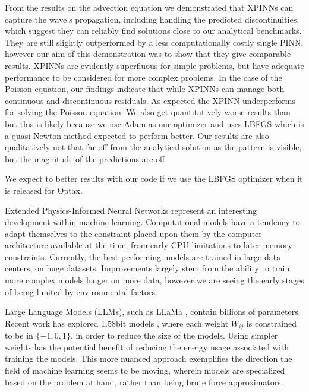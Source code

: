 From the results on the advection equation we demonstrated that XPINNs can capture the wave's propagation, including handling the predicted discontinuities, which suggest they can reliably find solutions close to our  analytical benchmarks. They are still slightly outperformed by a less computationally costly single PINN, however our aim of this demonstration was to show that they give comparable results. XPINNs are evidently superfluous for simple problems, but have adequate performance to be considered for more complex problems.
In the case of the Poisson equation, our findings indicate that while XPINNs can manage both continuous and discontinuous residuals. As expected the XPINN underperforms for solving the Poisson equation. We also get quantitatively worse results than \cite{XPINN_generalize} but this is likely because we use Adam as our optimizer and \cite{XPINN_generalize} uses LBFGS which is a quasi-Newton method expected to perform better. Our results are also qualitatively not that far off from the analytical solution as the pattern is visible, but the magnitude of the predictions are off.

We expect to better results with our code if we use the LBFGS optimizer when it is released for Optax.



Extended Physics-Informed Neural Networks represent an interesting development within machine learning.
Computational models have a tendency to adapt themselves to the constraint placed upon them by the computer architecture available at the time, from early CPU limitations to later memory constraints.
Currently, the best performing models are trained in large data centers, on huge datasets.
Improvements largely stem from the ability to train more complex models longer on more data, however we are seeing the early stages of being limited by environmental factors.

Large Language Models (LLMs), such as LLaMa \cite{touvron2023llama}, contain billions of parameters.
Recent work has explored 1.58bit models \cite{ma2024era}, where each weight $W_{ij}$ is constrained to be in $\{-1, 0, 1\}$, in order to reduce the size of the models.
Using simpler weights has the potential benefit of reducing the energy usage associated with training the models.
This more nuanced approach exemplifies the direction the field of machine learning seems to be moving, wherein models are specialized based on the problem at hand, rather than being brute force approximators.


